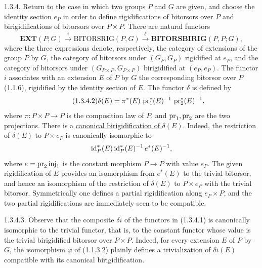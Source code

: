
1.3.4. Return to the case in which two groups $P$ and $G$ are given,
and choose the identity section $e_P$ in order to define
rigidifications of bitorsors over $P$ and birigidifications of bitorsors
over $P\times P$. There are natural functors
\begin{equation}\tag{1.3.4.1}
 \mathbf{EXT}(P;G)\xrightarrow{\ i\ }
 \mathrm{BITORSRIG}(P,G)\xrightarrow{\ \delta\ }
 \mathbf{BITORSBIRIG}(P,P;G),
\end{equation}
where the three expressions denote, respectively, the category of
extensions of the group $P$ by $G$, the category of bitorsors under
$(G_P,G_P)$ rigidified at $e_P$, and the category of bitorsors under
$(G_{P\times P},G_{P\times P})$ birigidified at $(e_P,e_P)$. The functor
$i$ associates with an extension $E$ of $P$ by $G$ the corresponding
bitorsor over $P$ (1.1.6), rigidified by the identity section of $E$.
The functor $\delta$ is defined by
\begin{equation}\tag{1.3.4.2}
 \delta(E)=\pi^*(E)\,\operatorname{pr}_1^*(E)^{-1}\,\operatorname{pr}_2^*(E)^{-1},
\end{equation}
where $\pi:P\times P\longrightarrow P$ is the composition law of $P$,
and $\operatorname{pr}_1,\operatorname{pr}_2$ are the two projections. There is a
\underline{canonical birigidification of $\delta(E)$}. Indeed, the
restriction of $\delta(E)$ to $P\times e_P$ is canonically isomorphic
to
\[
 \mathrm{id}_P^*(E)\,\mathrm{id}_P^*(E)^{-1}\,e^*(E)^{-1},
\]
where $e=\operatorname{pr}_2\operatorname{inj}_1$ is the constant morphism
$P\longrightarrow P$ with value $e_P$. The given rigidification of $E$
provides an isomorphism from $e^*(E)$ to the trivial bitorsor, and hence
an isomorphism of the restriction of $\delta(E)$ to $P\times e_P$ with
the trivial bitorsor. Symmetrically one defines a partial
rigidification along $e_P\times P$, and the two partial
rigidifications are immediately seen to be compatible.


1.3.4.3. Observe that the composite $\delta i$ of the functors in
(1.3.4.1) is canonically isomorphic to the trivial functor, that is, to
the constant functor whose value is the trivial birigidified bitorsor
over $P\times P$. Indeed, for every extension $E$ of $P$ by $G$, the
isomorphism $\varphi$ of (1.1.3.2) plainly defines a trivialization of
$\delta i(E)$ compatible with its canonical birigidification.

